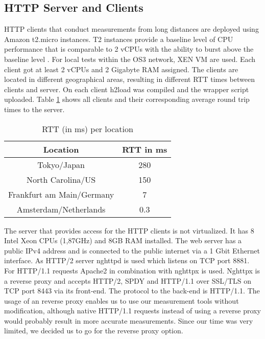 \subsection{HTTP Server and Clients}
\label{subsec:server_client}
HTTP clients that conduct measurements from long distances are deployed using Amazon t2.micro instances. T2 instances provide a baseline level of CPU performance that is comparable to 2 vCPUs with the ability to burst above the baseline level \cite{amazon-ts}. For local tests within the OS3 network, XEN VM are used. Each client got at least 2 vCPUs and 2 Gigabyte RAM assigned. The clients are located in different geographical areas, resulting in different RTT times between clients and server. On each client h2load was compiled and the wrapper script uploaded. Table \ref{table:locations} shows all clients and their corresponding average round trip times to the server.

\begin{table}[h]
	\centering
\begin{tabular}{ | c | c | }

\hline
\textbf{Location} & \textbf{RTT in ms}\\ \hline \hline
Tokyo/Japan &  280\\ \hline
North Carolina/US &  150\\ \hline 
Frankfurt am Main/Germany &  7\\ \hline
Amsterdam/Netherlands &  0.3\\

\hline
\end{tabular}
\caption{RTT (in ms) per location}
\label{table:locations}
\end{table}

The server that provides access for the HTTP clients is not virtualized. It has 8 Intel Xeon CPUs (1,87GHz) and 8GB RAM installed. The web server has a public IPv4 address and is connected to the public internet via a 1 Gbit Ethernet interface. As HTTP/2 server nghttpd \cite{nghttp} is used which listens on TCP port 8881. For HTTP/1.1 requests Apache2 \cite{apache2} in combination with nghttpx \cite{nghttpx} is used. Nghttpx is a reverse proxy and accepts HTTP/2, SPDY and HTTP/1.1 over SSL/TLS on TCP port 8443 via its front-end. The protocol to the back-end is HTTP/1.1. The usage of an reverse proxy enables us to use our measurement tools without modification, although native HTTP/1.1 requests instead of using a reverse proxy would probably result in more accurate measurements. Since our time was very limited, we decided us to go for the reverse proxy option.

